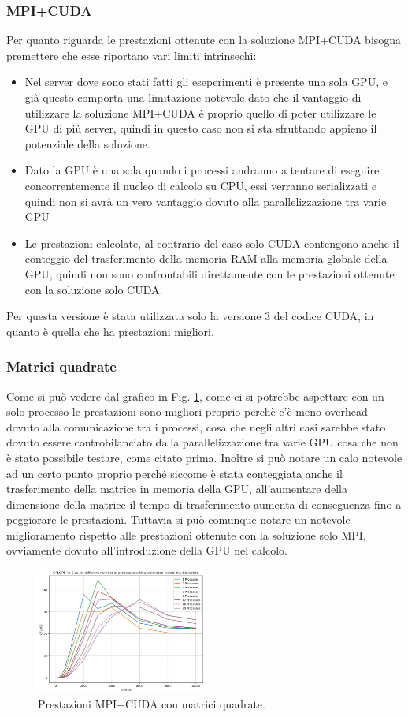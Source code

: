 \documentclass[conference]{IEEEtran}
\begin{document}
\subsubsection{MPI+CUDA}
Per quanto riguarda le prestazioni ottenute con la soluzione MPI+CUDA bisogna premettere che esse riportano vari limiti intrinsechi:
\begin{itemize}
    \item Nel server dove sono stati fatti gli eseperimenti è presente una sola GPU, e già questo comporta una limitazione notevole dato che il vantaggio di utilizzare la soluzione MPI+CUDA è proprio quello di poter utilizzare le GPU di più server, quindi in questo caso non si sta sfruttando appieno il potenziale della soluzione.
    \item Dato la GPU è una sola quando i processi andranno a tentare di eseguire concorrentemente il nucleo di calcolo su CPU, essi verranno serializzati e quindi non si avrà un vero vantaggio dovuto alla parallelizzazione tra varie GPU
    \item Le prestazioni calcolate, al contrario del caso solo CUDA contengono anche il conteggio del trasferimento della memoria RAM alla memoria globale della GPU, quindi non sono confrontabili direttamente con le prestazioni ottenute con la soluzione solo CUDA.
\end{itemize}
Per questa versione è stata utilizzata solo la versione 3 del codice CUDA, in quanto è quella che ha prestazioni migliori.
\subsubsection{Matrici quadrate}
Come si può vedere dal grafico in Fig. \ref{fig:mpi_cuda_square}, come ci si potrebbe aspettare con un solo processo le prestazioni sono migliori proprio perchè c'è meno overhead dovuto alla comunicazione tra i processi, cosa che negli altri casi sarebbe stato dovuto essere controbilanciato dalla parallelizzazione tra varie GPU cosa che non è stato possibile testare, come citato prima. 
Inoltre si può notare un calo notevole ad un certo punto proprio perché siccome è stata conteggiata anche il trasferimento della matrice in memoria della GPU, all'aumentare della dimensione della matrice il tempo di trasferimento aumenta di conseguenza fino a peggiorare le prestazioni. Tuttavia si può comunque notare un notevole miglioramento rispetto alle prestazioni ottenute con la soluzione solo MPI, ovviamente dovuto all'introduzione della GPU nel calcolo.
\begin{figure}[H]
    \centering
    \includegraphics[width=0.5\textwidth]{resources/mpi_cuda_square.jpg}
    \caption{Prestazioni MPI+CUDA con matrici quadrate.}
    \label{fig:mpi_cuda_square}
\end{figure}
\end{document}

